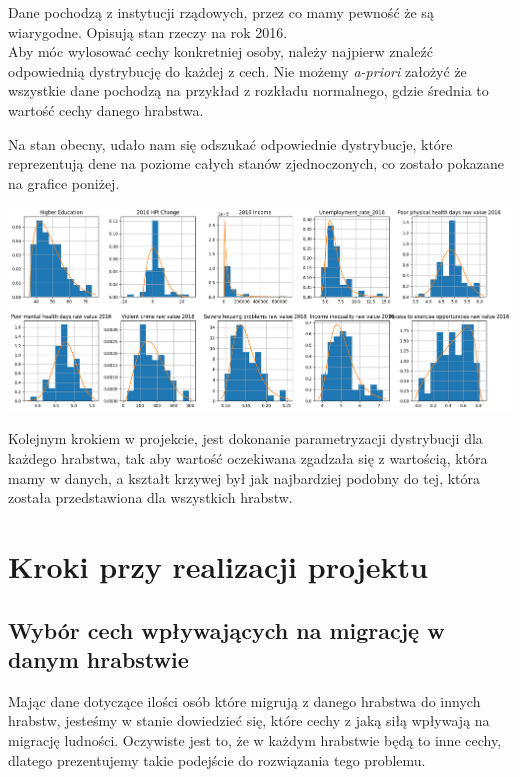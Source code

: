 \documentclass[a4paper,12pt]{article}
\begin{document}
Dane pochodzą z instytucji rządowych, przez co mamy pewność że są wiarygodne. Opisują stan rzeczy na rok 2016.\\

Aby móc wylosować cechy konkretniej osoby, należy najpierw znaleźć odpowiednią dystrybucję do każdej z cech. Nie możemy \textit{a-priori} założyć że wszystkie dane pochodzą na przykład z rozkładu normalnego, gdzie średnia to wartość cechy danego hrabstwa.

Na stan obecny, udało nam się odszukać odpowiednie dystrybucje, które reprezentują dene na poziome całych stanów zjednoczonych, co zostało pokazane na grafice poniżej.

\begin{center}
    \includegraphics*[width=15cm]{./pictures/distributions.png}
\end{center}

Kolejnym krokiem w projekcie, jest dokonanie parametryzacji dystrybucji dla każdego hrabstwa, tak aby wartość oczekiwana zgadzała się z wartością, która mamy w danych, a kształt krzywej był jak najbardziej podobny do tej, która została przedstawiona dla wszystkich hrabstw.

\section*{Kroki przy realizacji projektu}
\subsection*{Wybór cech wpływających na migrację w danym hrabstwie}
Mając dane dotyczące ilości osób które migrują z danego hrabstwa do innych hrabstw, jesteśmy w stanie dowiedzieć się, które cechy z jaką siłą wpływają na migrację ludności. Oczywiste jest to, że w każdym hrabstwie będą to inne cechy, dlatego prezentujemy takie podejście do rozwiązania tego problemu.
\end{document}
